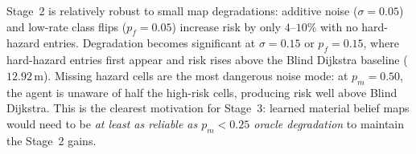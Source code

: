 \begin{table}[htbp]
\centering
\caption{%
  \textbf{Robustness to degraded oracle risk maps}
  (20 DFC2018 high-risk test episodes; mean $\pm$ 95\% CI).
  ``Class flip'' randomly flips terrain labels at rate $p_f$;
  ``additive noise'' adds $\mathcal{N}(0,\sigma^2)$ to $\tilde r$ and clips to $[0,1]$;
  ``missing hazard'' zeroes the risk of randomly chosen high-risk cells
  at rate $p_m$ before passing to Stage~2.
}
\label{tab:ch6:risk_noise}
\small
\setlength{\tabcolsep}{4pt}
\renewcommand{\arraystretch}{1.2}
\end{table}

Stage~2 is relatively robust to small map degradations:
additive noise ($\sigma{=}0.05$) and low-rate class flips ($p_f{=}0.05$)
increase risk by only $4$--$10\%$ with no hard-hazard entries.
Degradation becomes significant at $\sigma{=}0.15$ or $p_f{=}0.15$,
where hard-hazard entries first appear and risk rises above the
Blind Dijkstra baseline ($12.92$\,m).
Missing hazard cells are the most dangerous noise mode:
at $p_m{=}0.50$, the agent is unaware of half the high-risk cells,
producing risk well above Blind Dijkstra.
This is the clearest motivation for Stage~3: learned material belief maps
would need to be \emph{at least as reliable as $p_m{<}0.25$ oracle
degradation} to maintain the Stage~2 gains.

